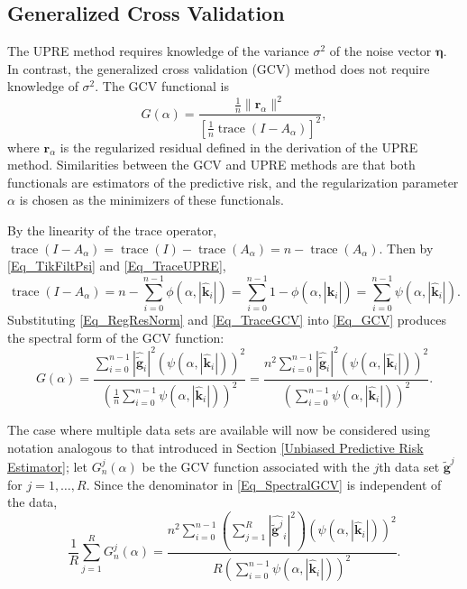 \documentclass[12pt]{article}
\newcommand{\gnoise}{\widetilde{\mathbf{g}}}
\newcommand{\kdis}{\mathbf{k}}
\newcommand{\trace}{\operatorname{trace}}	%
\newcommand{\regparam}{\alpha}
\newcommand{\filt}{\phi}
\newcommand{\mfilt}{\psi}
\newcommand{\noiseSD}{\sigma}	%
\newcommand{\noise}{\bm{\eta}}	%
\newcommand{\regres}{\mathbf{r}_{\regparam}}	%
\newcommand{\A}{A_{\regparam}}	%
\newcommand{\GCV}{G}	%
\begin{document}
\subsection{Generalized Cross Validation} \label{Generalized Cross Validation}
The UPRE method requires knowledge of the variance $\noiseSD^2$ of the noise vector $\noise$. In contrast, the generalized cross validation (GCV) method does not require knowledge of $\noiseSD^2$. The GCV functional is
\begin{equation}
\label{Eq_GCV}
\GCV(\regparam) = \frac{\frac{1}{n}\|\regres\|^2}{\left[\frac{1}{n}\trace(I-\A)\right]^2},
\end{equation}
where $\regres$ is the regularized residual defined in the derivation of the UPRE method. Similarities between the GCV and UPRE methods are that both functionals are estimators of the predictive risk, and the regularization parameter $\regparam$ is chosen as the minimizers of these functionals. \par 
By the linearity of the trace operator, $\trace(I-\A) = \trace(I)-\trace(\A) = n - \trace(\A)$. Then by \eqref{Eq_TikFiltPsi} and \eqref{Eq_TraceUPRE},
\begin{equation}
\trace(I-\A) = n - \sum_{i = 0}^{n-1} \filt(\regparam,|\widehat{\kdis}_i|) = \sum_{i = 0}^{n-1} 1 - \filt(\regparam,|\widehat{\kdis}_i|) = \sum_{i = 0}^{n-1} \mfilt(\regparam,|\widehat{\kdis}_i|).
\label{Eq_TraceGCV}
\end{equation}
Substituting \eqref{Eq_RegResNorm} and \eqref{Eq_TraceGCV} into \eqref{Eq_GCV} produces the spectral form of the GCV function:
\begin{equation}
\GCV(\regparam) = \frac{\sum_{i = 0}^{n-1} |\widehat{\gnoise}_i|^2(\mfilt(\regparam,|\widehat{\kdis}_i|))^2}{(\frac{1}{n}\sum_{i = 0}^{n-1} \mfilt(\regparam,|\widehat{\kdis}_i|))^2} = \frac{n^2\sum_{i = 0}^{n-1} |\widehat{\gnoise}_i|^2(\mfilt(\regparam,|\widehat{\kdis}_i|))^2}{(\sum_{i = 0}^{n-1} \mfilt(\regparam,|\widehat{\kdis}_i|))^2}.
\label{Eq_SpectralGCV}
\end{equation} \par 
The case where multiple data sets are available will now be considered using notation analogous to that introduced in Section \ref{Unbiased Predictive Risk Estimator}; let $\GCV_n^j(\regparam)$ be the GCV function associated with the $j$th data set $\gnoise^j$ for $j = 1,\ldots,R$. Since the denominator in \eqref{Eq_SpectralGCV} is independent of the data,
\begin{equation}
\frac{1}{R}\sum_{j=1}^R \GCV_n^j(\regparam)  = \frac{n^2\sum_{i = 0}^{n-1} \left(\sum_{j=1}^R |\widehat{\gnoise^j}_i|^2\right)(\mfilt(\regparam,|\widehat{\kdis}_i|))^2}{R(\sum_{i = 0}^{n-1} \mfilt(\regparam,|\widehat{\kdis}_i|))^2}.
\label{Eq_SpectralGCVsum}
\end{equation}
\end{document}
